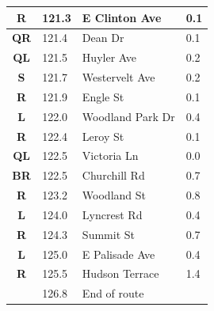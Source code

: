 \documentclass[11pt]{article}
\begin{document}
\begin{center}
\begin{supertabular}{|c|p{0.30in}|p{2.25in}|l|}
 \textbf{R} & 121.3 & E Clinton Ave &   0.1 \\ \hline
{} \textbf{QR} & 121.4 & Dean Dr &   0.1 \\ \hline
 \textbf{QL} & 121.5 & Huyler Ave &   0.2 \\ \hline
 \textbf{S} & 121.7 & Westervelt Ave &   0.2 \\ \hline
{} \textbf{R} & 121.9 & Engle St &   0.1 \\ \hline
 \textbf{L} & 122.0 & Woodland Park Dr &   0.4 \\ \hline
{} \textbf{R} & 122.4 & Leroy St &   0.1 \\ \hline
 \textbf{QL} & 122.5 & Victoria Ln &   0.0 \\ \hline
{} \textbf{BR} & 122.5 & Churchill Rd &   0.7 \\ \hline
{} \textbf{R} & 123.2 & Woodland St &   0.8 \\ \hline
 \textbf{L} & 124.0 & Lyncrest Rd &   0.4 \\ \hline
{} \textbf{R} & 124.3 & Summit St &   0.7 \\ \hline
 \textbf{L} & 125.0 & E Palisade Ave &   0.4 \\ \hline
{} \textbf{R} & 125.5 & Hudson Terrace &   1.4 \\ \hline
{} \textbf{} & 126.8 & End of route &  \\ \hline

\end{supertabular}
\end{center}
\end{document}
